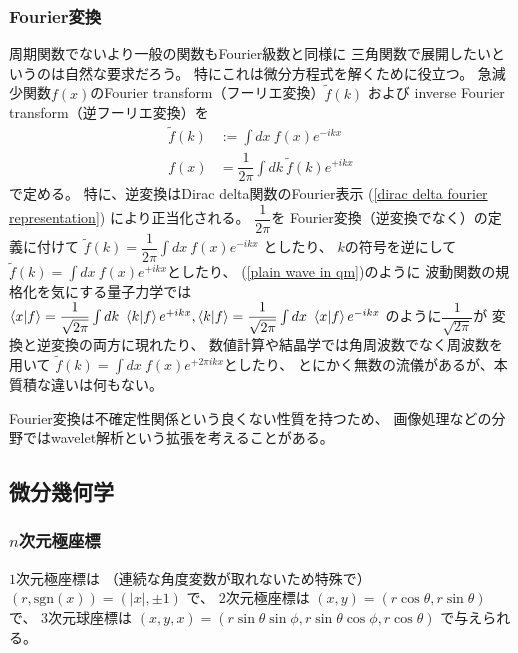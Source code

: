 \subsubsection{Fourier変換}

周期関数でないより一般の関数もFourier級数と同様に
三角関数で展開したいというのは自然な要求だろう。
特にこれは微分方程式を解くために役立つ。
急減少関数$f(x)$のFourier transform（フーリエ変換）$\tilde{f}(k)$
および
inverse Fourier transform（逆フーリエ変換）を
\begin{subequations}
\begin{align}
    \tilde{f}(k)
    &:=
    \int dx\ f(x) e^{-ikx}
\\
    f(x)
    &=
    \dfrac{1}{2\pi}\int dk\ 
    \tilde{f}(k) e^{+ikx}
\end{align}
\end{subequations}
で定める。
特に、逆変換はDirac delta関数のFourier表示
(\ref{dirac delta fourier representation})
により正当化される。
$\dfrac{1}{2\pi}$を
Fourier変換（逆変換でなく）の定義に付けて
$\tilde{f}(k)=\dfrac{1}{2\pi}\int dx\ f(x) e^{-ikx}$
としたり、
$k$の符号を逆にして
$\tilde{f}(k)=\int dx\ f(x) e^{+ikx}$としたり、
(\ref{plain wave in qm})のように
波動関数の規格化を気にする量子力学では
$
    \braket{ x | f }
    =
    \dfrac{1}{\sqrt{2\pi}}
    \int dk\ \braket{k | f} e^{+ikx}
    ,
    \braket{ k | f }
    =
    \dfrac{1}{\sqrt{2\pi}}
    \int dx\ \braket{x | f} e^{-ikx}
$
のように$\dfrac{1}{\sqrt{2\pi}}$が
変換と逆変換の両方に現れたり、
数値計算や結晶学では角周波数でなく周波数を用いて
$\tilde{f}(k)=\int dx\ f(x) e^{+2\pi ikx}$としたり、
とにかく無数の流儀があるが、本質積な違いは何もない。

Fourier変換は不確定性関係という良くない性質を持つため、
画像処理などの分野ではwavelet解析という拡張を考えることがある。

\newpage
\subsection{微分幾何学}

\subsubsection{$n$次元極座標}

$1$次元極座標は
（連続な角度変数が取れないため特殊で）
$(r, \mathrm{sgn}(x)) = (|x|, \pm 1)$
で、
$2$次元極座標は
$(x, y) = (r \cos \theta, r \sin \theta)$
で、
$3$次元球座標は
$(x, y, x)
=
    (r \sin \theta \sin \phi,
    r \sin \theta \cos \phi,
    r \cos \theta)$
で与えられる。

